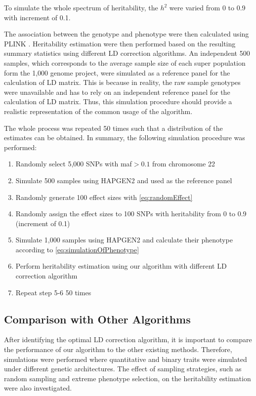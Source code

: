 		To simulate the whole spectrum of heritability, the $h^2$ were varied from 0 to 0.9 with increment of 0.1.
		
		The association between the genotype and phenotype were then calculated using PLINK \citep{Purcell2007}.
		Heritability estimation were then performed based on the resulting summary statistics using different \gls{LD} correction algorithms.
		An independent 500 samples, which corresponds to the average sample size of each super population form the 1,000 genome project, were simulated as a reference panel for the calculation of \gls{LD} matrix.
		This is because in reality, the raw sample genotypes were unavailable and has to rely on an independent reference panel for the calculation of \gls{LD} matrix. 
		Thus, this simulation procedure should provide a realistic representation of the common usage of the algorithm.
		
		The whole process was repeated 50 times such that a distribution of the estimates can be obtained. 
		In summary, the following simulation procedure was performed:
		\begin{enumerate}
			\item Randomly select 5,000 \glspl{SNP} with \gls{maf}$>0.1$ from chromosome 22
			\item Simulate 500 samples using HAPGEN2 and used as the reference panel
			\item Randomly generate 100 effect sizes with \cref{eq:randomEffect}
			\item Randomly assign the effect sizes to 100 \glspl{SNP} with heritability from 0 to 0.9 (increment of 0.1)
			\item Simulate 1,000 samples using HAPGEN2 and calculate their phenotype according to \cref{eq:simulationOfPhenotype} 
			\item Perform heritability estimation using our algorithm with different \gls{LD} correction algorithm
			\item Repeat step 5-6 50 times
		\end{enumerate}
		
		\subsection{Comparison with Other Algorithms}
		After identifying the optimal \gls{LD} correction algorithm, it is important to compare the performance of our algorithm to the other existing methods.
		Therefore, simulations were performed where quantitative and binary traits were simulated under different genetic architectures. 
		The effect of sampling strategies, such as random sampling and extreme phenotype selection, on the heritability estimation were also investigated.
		
